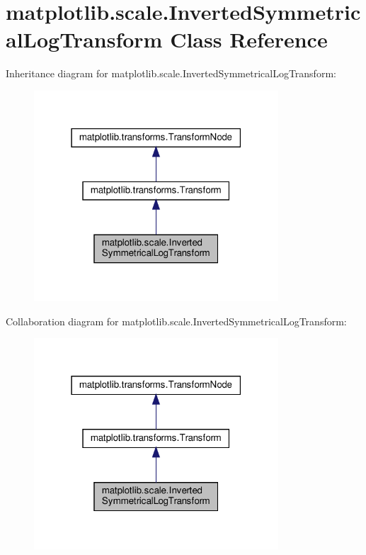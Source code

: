 \hypertarget{classmatplotlib_1_1scale_1_1InvertedSymmetricalLogTransform}{}\section{matplotlib.\+scale.\+Inverted\+Symmetrical\+Log\+Transform Class Reference}
\label{classmatplotlib_1_1scale_1_1InvertedSymmetricalLogTransform}


Inheritance diagram for matplotlib.\+scale.\+Inverted\+Symmetrical\+Log\+Transform\+:
\nopagebreak
\begin{figure}[H]
\begin{center}
\leavevmode
\includegraphics[width=259pt]{classmatplotlib_1_1scale_1_1InvertedSymmetricalLogTransform__inherit__graph}
\end{center}
\end{figure}


Collaboration diagram for matplotlib.\+scale.\+Inverted\+Symmetrical\+Log\+Transform\+:
\nopagebreak
\begin{figure}[H]
\begin{center}
\leavevmode
\includegraphics[width=259pt]{classmatplotlib_1_1scale_1_1InvertedSymmetricalLogTransform__coll__graph}
\end{center}
\end{figure}
